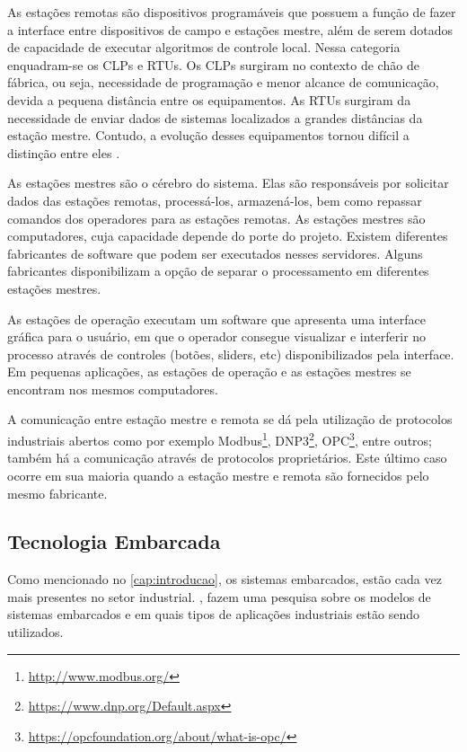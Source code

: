 		As estações remotas são dispositivos programáveis que possuem a função de fazer a interface entre dispositivos de campo e estações mestre, além de serem dotados de capacidade de executar algoritmos de controle local. Nessa categoria enquadram-se os CLPs e RTUs. Os CLPs surgiram no contexto de chão de fábrica, ou seja, necessidade de programação e menor alcance de comunicação, devida a pequena distância entre os equipamentos. As RTUs surgiram da necessidade de enviar dados de sistemas localizados a grandes distâncias da estação mestre. Contudo, a evolução desses equipamentos tornou difícil a distinção entre eles \cite{bailey2003}.
		
		As estações mestres são o cérebro do sistema. Elas são responsáveis por solicitar dados das estações remotas, processá-los, armazená-los, bem como repassar comandos dos operadores para as estações remotas. As estações mestres são computadores, cuja capacidade depende do porte do projeto. Existem diferentes fabricantes de software que podem ser executados nesses servidores. Alguns fabricantes disponibilizam a opção de separar o processamento em diferentes estações mestres.
		
		As estações de operação executam um software que apresenta uma interface gráfica para o usuário, em que o operador consegue visualizar e interferir no processo através de controles (botões, sliders, etc) disponibilizados pela interface. Em pequenas aplicações, as estações de operação e as estações mestres se encontram nos mesmos computadores.
	
		A comunicação entre estação mestre e remota se dá pela utilização de protocolos industriais abertos como por exemplo Modbus\footnote{\url{http://www.modbus.org/}}, DNP3\footnote{\url{https://www.dnp.org/Default.aspx}}, OPC\footnote{\url{https://opcfoundation.org/about/what-is-opc/}}, entre outros; também há a comunicação através de protocolos proprietários. Este último caso ocorre em sua maioria quando a estação mestre e remota são fornecidos pelo mesmo fabricante.
	
	\subsection{Tecnologia Embarcada}
		Como mencionado no \autoref{cap:introducao}, os sistemas embarcados, estão cada vez mais presentes no setor industrial. \textcite{yu2011}, fazem uma pesquisa sobre os modelos de sistemas embarcados e em quais tipos de aplicações industriais estão sendo utilizados.
		
